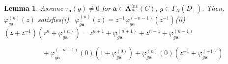\documentclass[a4paper]{article}%
\newtheorem{lemma}{Lemma}
\begin{document}
\begin{lemma}
\label{l2-9}Assume $\tau_{\boldsymbol{a}}\left(  g\right)  \neq0$ for
$\boldsymbol{a}\in\boldsymbol{A}_{N}^{inv}\left(  C\right)  $, $g\in\Gamma
_{N}\left(  D_{+}\right)  $. Then, $\varphi_{g\boldsymbol{a}}^{\left(
n\right)  }\left(  z\right)  $ satisfies\newline(i) \ $\varphi_{\widetilde
{g\boldsymbol{a}}}^{\left(  n\right)  }\left(  z\right)  =z^{-1}%
\varphi_{g\boldsymbol{a}}^{\left(  -n-1\right)  }\left(  z^{-1}\right)
$\newline(ii) $\left(  z+z^{-1}\right)  \left(  z^{n}+\varphi_{g\boldsymbol{a}%
}^{\left(  n\right)  }\right)  =z^{n+1}+\varphi_{g\boldsymbol{a}}^{\left(
n+1\right)  }+z^{n-1}+\varphi_{g\boldsymbol{a}}^{\left(  n-1\right)  }$

$\ \ \ \ \ \ \ \ \ \ \ \ \ \ \ \ \ \ \ \ \ \ \ \ \ +\varphi_{\widetilde
{g\boldsymbol{a}}}^{\left(  -n-1\right)  }\left(  0\right)  \left(
1+\varphi_{g\boldsymbol{a}}^{\left(  0\right)  }\right)  +\varphi
_{g\boldsymbol{a}}^{\left(  n\right)  }\left(  0\right)  \left(
z^{-1}+\varphi_{g\boldsymbol{a}}^{\left(  -1\right)  }\right)
\ \ \ \ \ \ \ \ \ \ \ \ \ \ \ \ \ \ \ \ \ \ \ \ \ \ \ \ \ \ \ \ \ \ \ \ \ \ \ \ \ $%

\end{lemma}
\end{document}
